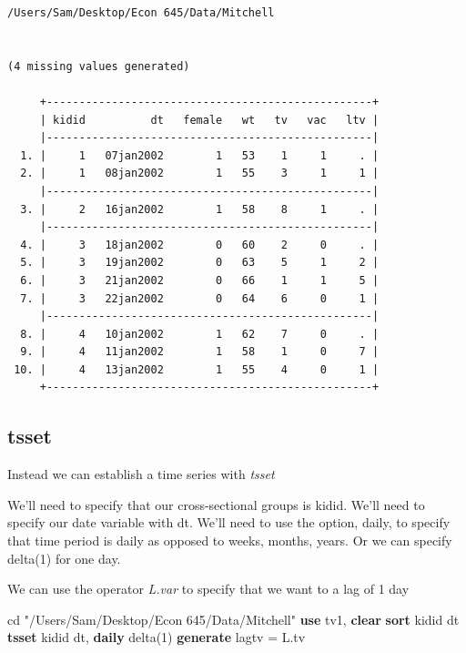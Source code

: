 \documentclass[
]{book}
\newenvironment{Shaded}{\begin{snugshade}}{\end{snugshade}}
\newcommand{\FunctionTok}[1]{\textcolor[rgb]{0.13,0.29,0.53}{\textbf{#1}}}
\newcommand{\KeywordTok}[1]{\textcolor[rgb]{0.13,0.29,0.53}{\textbf{#1}}}
\newcommand{\NormalTok}[1]{#1}
\newcommand{\StringTok}[1]{\textcolor[rgb]{0.31,0.60,0.02}{#1}}
\begin{document}
\begin{verbatim}
/Users/Sam/Desktop/Econ 645/Data/Mitchell


(4 missing values generated)

     +--------------------------------------------------+
     | kidid          dt   female   wt   tv   vac   ltv |
     |--------------------------------------------------|
  1. |     1   07jan2002        1   53    1     1     . |
  2. |     1   08jan2002        1   55    3     1     1 |
     |--------------------------------------------------|
  3. |     2   16jan2002        1   58    8     1     . |
     |--------------------------------------------------|
  4. |     3   18jan2002        0   60    2     0     . |
  5. |     3   19jan2002        0   63    5     1     2 |
  6. |     3   21jan2002        0   66    1     1     5 |
  7. |     3   22jan2002        0   64    6     0     1 |
     |--------------------------------------------------|
  8. |     4   10jan2002        1   62    7     0     . |
  9. |     4   11jan2002        1   58    1     0     7 |
 10. |     4   13jan2002        1   55    4     0     1 |
     +--------------------------------------------------+
\end{verbatim}

\subsection*{tsset}\label{tsset}

Instead we can establish a time series with \emph{tsset}

We'll need to specify that our cross-sectional groups is kidid.
We'll need to specify our date variable with dt.
We'll need to use the option, daily, to specify that time period is daily
as opposed to weeks, months, years. Or we can specify delta(1) for one day.

We can use the operator \emph{L.var} to specify that we want to a lag of 1 day

\begin{Shaded}
\begin{Highlighting}[]
\NormalTok{cd }\StringTok{"/Users/Sam/Desktop/Econ 645/Data/Mitchell"}
\KeywordTok{use}\NormalTok{ tv1, }\KeywordTok{clear}
\KeywordTok{sort}\NormalTok{ kidid dt}
\KeywordTok{tsset}\NormalTok{ kidid dt, }\FunctionTok{daily}\NormalTok{ delta(1)}
\KeywordTok{generate}\NormalTok{ lagtv = L.tv}
\end{Highlighting}
\end{Shaded}
\end{document}
